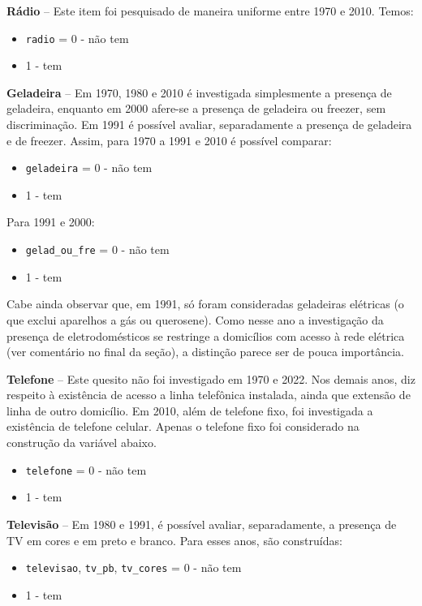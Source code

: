 \documentclass[12pt,a4paper]{article}
\newcommand{\vr}[1]{\texttt{#1}}
\begin{document}
\textbf{Rádio} -- Este item foi pesquisado de maneira uniforme entre 1970 e 2010. Temos:
\begin{itemize}
  \item \vr{radio} = 0 - não tem
  \item 1 - tem
\end{itemize}

\textbf{Geladeira} -- Em 1970, 1980 e 2010 é investigada simplesmente a presença de geladeira, enquanto em 2000 afere-se a presença de geladeira ou freezer, sem discriminação. Em 1991 é possível avaliar, separadamente a presença de geladeira e de freezer. Assim, para 1970 a 1991 e 2010 é possível comparar:
\begin{itemize}
  \item \vr{geladeira} = 0 - não tem
  \item 1 - tem
\end{itemize}

Para 1991 e 2000:
\begin{itemize}
  \item \vr{gelad\_ou\_fre} = 0 - não tem
  \item 1 - tem
\end{itemize}

Cabe ainda observar que, em 1991, só foram consideradas geladeiras elétricas (o que exclui aparelhos a gás ou querosene). Como nesse ano a investigação da presença de eletrodomésticos se restringe a domicílios com acesso à rede elétrica (ver comentário no final da seção), a distinção parece ser de pouca importância.

\textbf{Telefone} -- Este quesito não foi investigado em 1970 e 2022. Nos demais anos, diz respeito à existência de acesso a linha telefônica instalada, ainda que extensão de linha de outro domicílio. Em 2010, além de telefone fixo, foi investigada a existência de telefone celular. Apenas o telefone fixo foi considerado na construção da variável abaixo.
\begin{itemize}
  \item \vr{telefone} = 0 - não tem
  \item 1 - tem
\end{itemize}

\textbf{Televisão} -- Em 1980 e 1991, é possível avaliar, separadamente, a presença de TV em cores e em preto e branco. Para esses anos, são construídas:
\begin{itemize}
  \item \vr{televisao}, \vr{tv\_pb}, \vr{tv\_cores} = 0 - não tem
  \item 1 - tem
\end{itemize}
\end{document}
